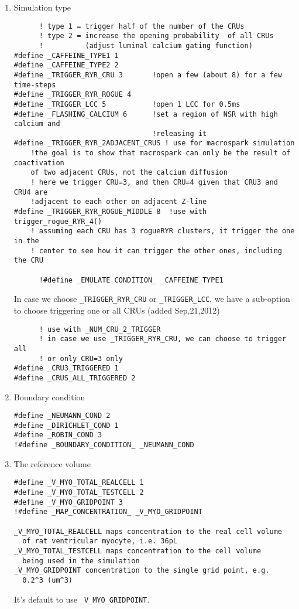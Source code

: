 \begin{enumerate}
\item Simulation type
\begin{verbatim}
      ! type 1 = trigger half of the number of the CRUs
      ! type 2 = increase the opening probability  of all CRUs 
      !          (adjust luminal calcium gating function)  
#define _CAFFEINE_TYPE1 1 
#define _CAFFEINE_TYPE2 2
#define _TRIGGER_RYR_CRU 3       !open a few (about 8) for a few time-steps
#define _TRIGGER_RYR_ROGUE 4      
#define _TRIGGER_LCC 5           !open 1 LCC for 0.5ms
#define _FLASHING_CALCIUM 6      !set a region of NSR with high calcium and
                                 !releasing it
#define _TRIGGER_RYR_2ADJACENT_CRUS ! use for macrospark simulation
    !the goal is to show that macrospark can only be the result of coactivation
    of two adjacent CRUs, not the calcium diffusion
    ! here we trigger CRU=3, and then CRU=4 given that CRU3 and CRU4 are
    !adjacent to each other on adjacent Z-line
#define _TRIGGER_RYR_ROGUE_MIDDLE 8  !use with trigger_rogue_RYR_4()
    ! assuming each CRU has 3 rogueRYR clusters, it trigger the one in the
    ! center to see how it can trigger the other ones, including the CRU
    
      !#define _EMULATE_CONDITION_ _CAFFEINE_TYPE1
\end{verbatim}
In case we choose \verb!_TRIGGER_RYR_CRU! or \verb!_TRIGGER_LCC!, we have a
sub-option to choose triggering one or all CRUs (added Sep,21,2012)
\begin{verbatim}
      ! use with _NUM_CRU_2_TRIGGER
      ! in case we use _TRIGGER_RYR_CRU, we can choose to trigger all
      ! or only CRU=3 only
#define _CRU3_TRIGGERED 1
#define _CRUS_ALL_TRIGGERED 2
\end{verbatim}


\item Boundary condition
\begin{verbatim}
#define _NEUMANN_COND 2
#define _DIRICHLET_COND 1
#define _ROBIN_COND 3
!#define _BOUNDARY_CONDITION_ _NEUMANN_COND      
\end{verbatim}

\item The reference volume

\begin{verbatim}
#define _V_MYO_TOTAL_REALCELL 1
#define _V_MYO_TOTAL_TESTCELL 2            
#define _V_MYO_GRIDPOINT 3
!#define _MAP_CONCENTRATION_ _V_MYO_GRIDPOINT

_V_MYO_TOTAL_REALCELL maps concentration to the real cell volume 
  of rat ventricular myocyte, i.e. 36pL
_V_MYO_TOTAL_TESTCELL maps concentration to the cell volume
  being used in the simulation
_V_MYO_GRIDPOINT concentration to the single grid point, e.g.
  0.2^3 (um^3)
\end{verbatim}
It's default to use \verb!_V_MYO_GRIDPOINT!.


\end{enumerate}

